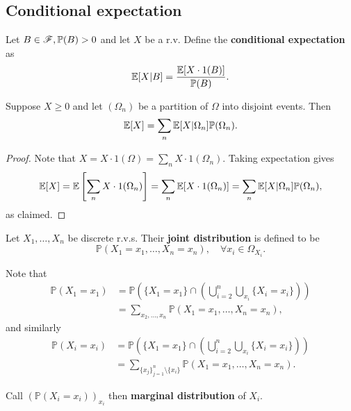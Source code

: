 \subsection{Conditional expectation}
\begin{definition}
    Let $B\in \mathscr{F},{\mathbb{P}}(B)>0$ and let $ X $ be a r.v. Define the \textbf{conditional expectation} as
    \[
        {\mathbb{E}}[X|B] = \frac{{\mathbb{E}}[X\cdot 1(B)]}{{\mathbb{P}}(B)}.
    \]
\end{definition}
\begin{proposition}\label{prop:Law of total expectation}
    Suppose $X\ge 0$ and let $ (\Omega_n) $ be a partition of $\Omega$ into disjoint events. Then 
    \[
        {\mathbb{E}}[X] = \sum_{n} {\mathbb{E}}[X|\Omega_n]\mathbb{P}(\Omega_n).
    \]
\end{proposition}
\begin{proof}
    Note that $ X=X \cdot 1(\Omega)=\sum_{n} X \cdot 1(\Omega_n) $. Taking expectation gives
    \[
    {\mathbb{E}}[X] = {\mathbb{E}}\left[ \sum_{n} X \cdot 1(\Omega_n) \right] = \sum_{n}{\mathbb{E}}[X\cdot 1(\Omega_n)]=\sum_{n} {\mathbb{E}}[X|\Omega_n]\mathbb{P}(\Omega_n),
    \]
    as claimed.
\end{proof}

\begin{definition}
    Let $ X_1,\dots,X_n $ be discrete r.v.s. Their \textbf{joint distribution} is defined to be 
    \[
        \mathbb{P}(X_1=x_1,\dots,X_n=x_n), \quad \forall x_i\in \Omega_{X_i}.
    \]
\end{definition}

Note that 
\begin{align*}
    \mathbb{P}(X_1=x_1) &= \mathbb{P}\left( \{X_1=x_1\} \cap \left( \bigcup_{i=2}^{n} \bigcup_{x_i} \{X_i=x_i\} \right) \right)\\ 
    &= \sum_{x_2,\dots,x_n} \mathbb{P}(X_1=x_1,\dots,X_n=x_n),
\end{align*}
and similarly 
\begin{align*}
    \mathbb{P}(X_i=x_i) &= \mathbb{P}\left( \{X_1=x_1\} \cap \left( \bigcup_{i=2}^{n} \bigcup_{x_i} \{X_i=x_i\} \right) \right)\\ 
    &= \sum_{\{x_j\}_{j=1}^n\setminus\{x_i\}} \mathbb{P}(X_1=x_1,\dots,X_n=x_n).
\end{align*}
\begin{definition}
    Call $ (\mathbb{P}(X_i=x_i) )_{x_i}$ then \textbf{marginal distribution} of $X_i$.
\end{definition}

